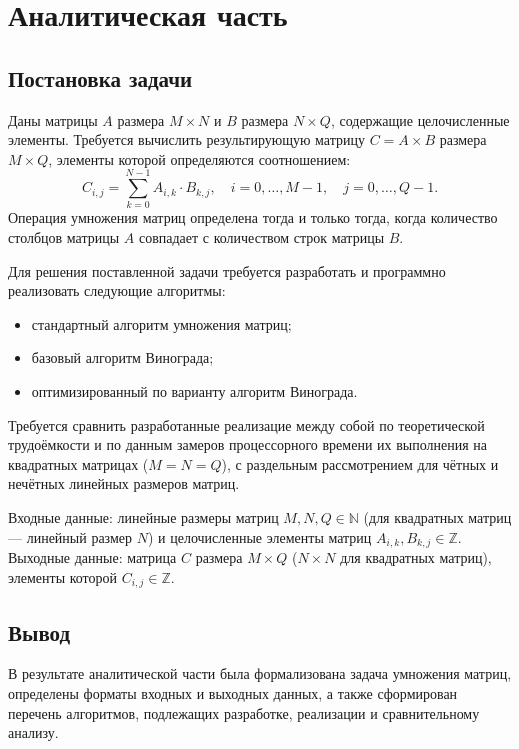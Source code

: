 \chapter{Аналитическая часть}

\section{Постановка задачи}
Даны матрицы $A$ размера $M \times N$ и $B$ размера $N \times Q$, содержащие целочисленные элементы. Требуется вычислить результирующую матрицу $C = A \times B$ размера $M \times Q$, элементы которой определяются соотношением:
\begin{equation}
    C_{i,j} = \sum_{k=0}^{N-1} A_{i,k} \cdot B_{k,j}, \quad i = 0, \ldots, M - 1, \quad j = 0, \ldots, Q - 1.
\end{equation}
Операция умножения матриц определена тогда и только тогда, когда количество столбцов матрицы $A$ совпадает с количеством строк матрицы $B$.

Для решения поставленной задачи требуется разработать и программно реализовать следующие алгоритмы:
\begin{itemize}
    \item стандартный алгоритм умножения матриц;
    \item базовый алгоритм Винограда;
    \item оптимизированный по варианту алгоритм Винограда.
\end{itemize}

Требуется сравнить разработанные реализацие между собой по теоретической трудоёмкости и по данным замеров процессорного времени их выполнения на квадратных матрицах ($M = N = Q$), с раздельным рассмотрением для чётных и нечётных линейных размеров матриц.

Входные данные: линейные размеры матриц $M, N, Q \in \mathbb{N}$ (для квадратных матриц --- линейный размер $N$) и целочисленные элементы матриц $A_{i,k}, B_{k,j} \in \mathbb{Z}$. Выходные данные: матрица $C$ размера $M \times Q$ ($N \times N$ для квадратных матриц), элементы которой $C_{i,j} \in \mathbb{Z}$.

\section{Вывод}
В результате аналитической части была формализована задача умножения матриц, определены форматы входных и выходных данных, а также сформирован перечень алгоритмов, подлежащих разработке, реализации и сравнительному анализу.